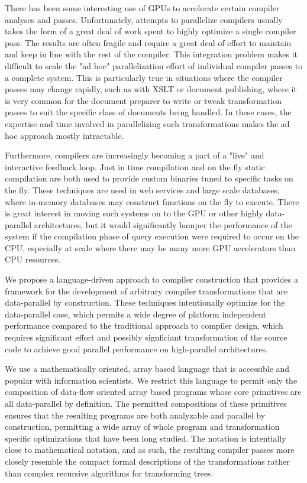 \documentclass[numbers,preprint]{sigplanconf}
\begin{document}
There has been some interesting use of GPUs to accelerate certain compiler analyses and passes. 
Unfortunately, attempts to parallelize compilers usually takes the form of a great deal of work spent to 
highly optimize a single compiler pass. The results are often fragile and require a great deal of effort 
to maintain and keep in line with the rest of the compiler. This integration problem makes it difficult to 
scale the "ad hoc" parallelization effort of individual compiler passes to a complete system. This is 
particularly true in situations where the compiler passes may change rapidly, such as with XSLT or 
document publishing, where it is very common for the document preparer to write or tweak transformation 
passes to suit the specific class of documents being handled. In these cases, the expertise and time 
involved in parallelizing such transformations makes the ad hoc approach mostly intractable. 

Furthermore, compilers are increasingly becoming a part of a "live" and interactive feedback loop. 
Just in time compilation and on the fly static compilation are both used to provide custom binaries tuned 
to specific tasks on the fly. These techniques are used in web services and large scale databases, where 
in-memory databases may construct functions on the fly to execute. There is great interest in moving 
such systems on to the GPU or other highly data-parallel architectures, but it would significantly hamper 
the performance of the system if the compilation phase of query execution were required to occur on the 
CPU, especially at scale where there may be many more GPU accelerators than CPU resources. 

We propose a language-driven approach to compiler construction that provides a framework for the 
development of arbitrary compiler transformations that are data-parallel by construction. These 
techniques intentionally optimize for the data-parallel case, which permits a wide degree of platform 
independent performance compared to the traditional approach to compiler design, which requires 
significant effort and possibly signficiant transformation of the source code to achieve good parallel 
performance on high-parallel architectures. 

We use a mathematically oriented, array based language that is accessible and popular with information 
scientists. We restrict this language to permit only the composition of data-flow oriented array based 
programs whose core primitives are all data-parallel by definition. The permitted compositions of these 
primitives ensures that the resulting programs are both analyzable and parallel by construction, permitting 
a wide array of whole program and transformation specific optimizations that have been long studied. 
The notation is intentially close to mathematical notation, and as such, the resulting compiler passes 
more closely resemble the compact formal descriptions of the transformations rather than complex 
recursive algorithms for transforming trees. 
\end{document}
